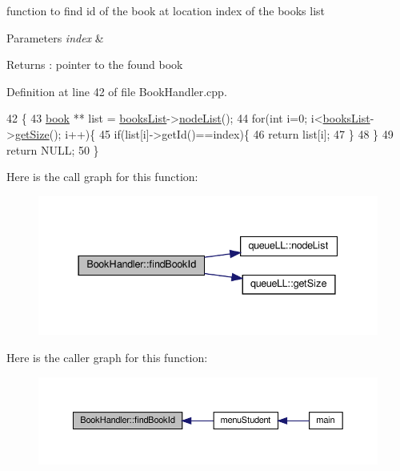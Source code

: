 function to find id of the book at location index of the books list 
\begin{DoxyParams}{Parameters}
{\em index} & \\
\hline
\end{DoxyParams}
\begin{DoxyReturn}{Returns}
\+: pointer to the found book 
\end{DoxyReturn}


Definition at line 42 of file Book\+Handler.\+cpp.


\begin{DoxyCode}
42                                         \{
43     \hyperlink{classbook}{book} ** list = \hyperlink{class_book_handler_a13a6c78422b3ad7acd5ebdb9555a0286}{booksList}->\hyperlink{classqueue_l_l_ae9a479b9463f51c5148dd80b68335d32}{nodeList}();
44     \textcolor{keywordflow}{for}(\textcolor{keywordtype}{int} i=0; i<\hyperlink{class_book_handler_a13a6c78422b3ad7acd5ebdb9555a0286}{booksList}->\hyperlink{classqueue_l_l_a8969feebcb563f0b489bc112422b9563}{getSize}(); i++)\{
45         \textcolor{keywordflow}{if}(list[i]->getId()==index)\{
46             \textcolor{keywordflow}{return} list[i];
47         \}
48     \}
49     \textcolor{keywordflow}{return} NULL;
50 \}
\end{DoxyCode}
Here is the call graph for this function\+:
\nopagebreak
\begin{figure}[H]
\begin{center}
\leavevmode
\includegraphics[width=337pt]{class_book_handler_ae82abc7349e19e59cd6f3cb23c7928fa_cgraph}
\end{center}
\end{figure}
Here is the caller graph for this function\+:
\nopagebreak
\begin{figure}[H]
\begin{center}
\leavevmode
\includegraphics[width=350pt]{class_book_handler_ae82abc7349e19e59cd6f3cb23c7928fa_icgraph}
\end{center}
\end{figure}
\mbox{\label{class_book_handler_a2939194b5d19618d5a69743b4c0dc240}} 
